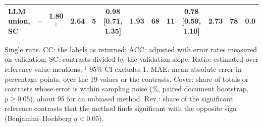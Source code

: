 \begin{table}[t]
\begin{tabular*}{\textwidth}{@{\extracolsep{\fill}}lcccccccccccc@{}}
LLM union, SC & -- & 1.80$^\dagger$ & 2.64 & 5 & 0.98 [0.71, 1.35] & 1.93 & 68 & 11 & 0.78 [0.59, 1.10] & 2.73 & 78 & 0.0 \\
\bottomrule
\end{tabular*}
\par\vspace{2pt}
\begin{minipage}{\textwidth}\scriptsize Single runs. CC: the labels as returned; ACC: adjusted with error rates measured on validation; SC: contrasts divided by the validation slope. Ratio: estimated over reference value mentions, $^\dagger$ 95\% CI excludes 1. MAE: mean absolute error in percentage points, over the 19 values or the contrasts. Cover: share of totals or contrasts whose error is within sampling noise (\%, paired document bootstrap, $p \geq 0.05$), about 95 for an unbiased method. Rev.: share of the significant reference contrasts that the method finds significant with the opposite sign (Benjamini--Hochberg $q < 0.05$).\end{minipage}
\end{table}
